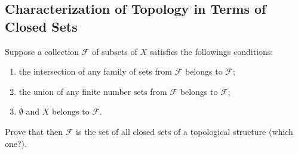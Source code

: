 \subsection{Characterization of Topology in Terms of Closed Sets}

\begin{minorEx}
    Suppose a collection $\mathcal{F}$ of subsets of $X$ satisfies the
    followings conditions:
    \begin{enumerate}
        \item the intersection of any family of sets from $\mathcal{F}$ belongs
            to $\mathcal{F}$;
        \item the union of any finite number sets from $\mathcal{F}$ belongs to
            $\mathcal{F}$;
        \item $\emptyset$ and $X$ belongs to $\mathcal{F}$.
    \end{enumerate}
    Prove that then $\mathcal{F}$ is the set of all closed sets of a topological
    structure (which one?).
\end{minorEx}

